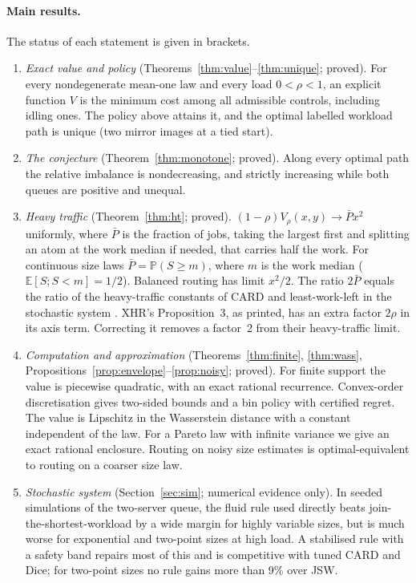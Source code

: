 \documentclass[11pt]{article}
\numberwithin{equation}{section}
\theoremstyle{definition}
\theoremstyle{remark}
\newcommand{\E}{\mathbb{E}}
\newcommand{\Prob}{\mathbb{P}}
\begin{document}
\paragraph{Main results.} The status of each statement is given in brackets.
\begin{enumerate}[label=(\roman*)]
\item \emph{Exact value and policy} (Theorems~\ref{thm:value}--\ref{thm:unique}; proved). For every nondegenerate mean-one law and every load $0<\rho<1$, an explicit function $V$ is the minimum cost among all admissible controls, including idling ones. The policy above attains it, and the optimal labelled workload path is unique (two mirror images at a tied start).
\item \emph{The conjecture} (Theorem~\ref{thm:monotone}; proved). Along every optimal path the relative imbalance is nondecreasing, and strictly increasing while both queues are positive and unequal.
\item \emph{Heavy traffic} (Theorem~\ref{thm:ht}; proved). $(1-\rho)V_\rho(x,y)\to\bar P x^2$ uniformly, where $\bar P$ is the fraction of jobs, taking the largest first and splitting an atom at the work median if needed, that carries half the work. For continuous size laws $\bar P=\Prob(S\ge m)$, where $m$ is the work median ($\E[S;S<m]=1/2$). Balanced routing has limit $x^2/2$. The ratio $2\bar P$ equals the ratio of the heavy-traffic constants of CARD and least-work-left in the stochastic system \cite{XGS2024}. XHR's Proposition~3, as printed, has an extra factor $2\rho$ in its axis term. Correcting it removes a factor~2 from their heavy-traffic limit.
\item \emph{Computation and approximation} (Theorems~\ref{thm:finite}, \ref{thm:wass}, Propositions~\ref{prop:envelope}--\ref{prop:noisy}; proved). For finite support the value is piecewise quadratic, with an exact rational recurrence. Convex-order discretisation gives two-sided bounds and a bin policy with certified regret. The value is Lipschitz in the Wasserstein distance with a constant independent of the law. For a Pareto law with infinite variance we give an exact rational enclosure. Routing on noisy size estimates is optimal-equivalent to routing on a coarser size law.
\item \emph{Stochastic system} (Section~\ref{sec:sim}; numerical evidence only). In seeded simulations of the two-server queue, the fluid rule used directly beats join-the-shortest-workload by a wide margin for highly variable sizes, but is much worse for exponential and two-point sizes at high load. A stabilised rule with a safety band repairs most of this and is competitive with tuned CARD and Dice; for two-point sizes no rule gains more than 9\% over JSW.
\end{enumerate}
\end{document}
